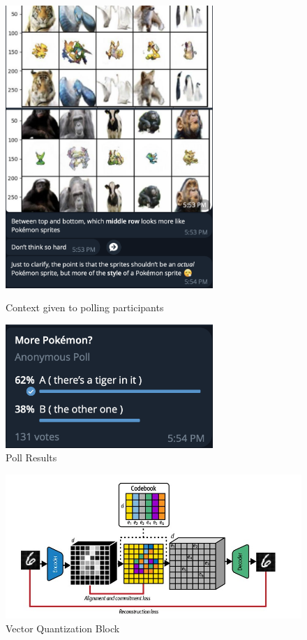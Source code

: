\documentclass[twoside,english,notitlepage]{report}
\begin{document}
\begin{figure}[h]
    \centering
    \includegraphics[width=0.7\textwidth]{task2/subjectivePolling.png}
    \vspace{-10pt}
    \caption{Context given to polling participants}
    \vspace{12pt}
    \includegraphics[width=0.7\textwidth]{task2/surveyResults.png}
    \vspace{-10pt}
    \caption{Poll Results}
    \vspace{12pt}
    \label{fig:survey}
\end{figure}

\begin{figure}[h]
    \centering
    \includegraphics[width=\textwidth]{task2/vq-block.jpg}
    \caption{Vector Quantization Block}
    \label{fig:vq-concept}
\end{figure}
\end{document}
